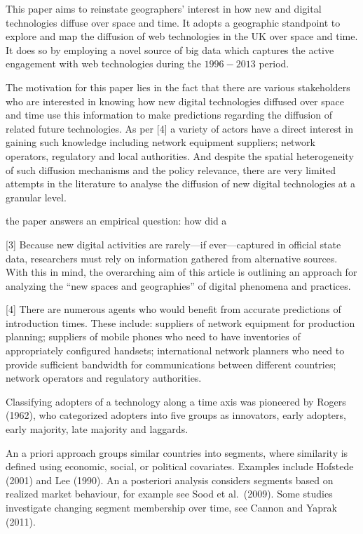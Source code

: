 \documentclass[10pt,letterpaper]{article}
\begin{document}
This paper aims to reinstate geographers' interest in how new and
digital technologies diffuse over space and time. It adopts a geographic
standpoint to explore and map the diffusion of web technologies in the
UK over space and time. It does so by employing a novel source of big
data which captures the active engagement with web technologies during
the \(1996-2013\) period.

The motivation for this paper lies in the fact that there are various
stakeholders who are interested in knowing how new digital technologies
diffused over space and time use this information to make predictions
regarding the diffusion of related future technologies. As per {[}4{]} a
variety of actors have a direct interest in gaining such knowledge
including network equipment suppliers; network operators, regulatory and
local authorities. And despite the spatial heterogeneity of such
diffusion mechanisms and the policy relevance, there are very limited
attempts in the literature to analyse the diffusion of new digital
technologies at a granular level.

the paper answers an empirical question: how did a

{[}3{]} Because new digital activities are rarely---if ever---captured
in official state data, researchers must rely on information gathered
from alternative sources. With this in mind, the overarching aim of this
article is outlining an approach for analyzing the ``new spaces and
geographies'' of digital phenomena and practices.

{[}4{]} There are numerous agents who would benefit from accurate
predictions of introduction times. These include: suppliers of network
equipment for production planning; suppliers of mobile phones who need
to have inventories of appropriately configured handsets; international
network planners who need to provide sufficient bandwidth for
communications between different countries; network operators and
regulatory authorities.

Classifying adopters of a technology along a time axis was pioneered by
Rogers (1962), who categorized adopters into five groups as innovators,
early adopters, early majority, late majority and laggards.

An a priori approach groups similar countries into segments, where
similarity is defined using economic, social, or political covariates.
Examples include Hofstede (2001) and Lee (1990). An a posteriori
analysis considers segments based on realized market behaviour, for
example see Sood et al.~(2009). Some studies investigate changing
segment membership over time, see Cannon and Yaprak (2011).
\end{document}
